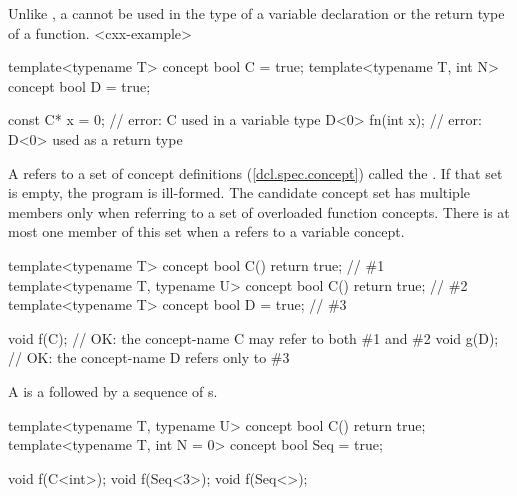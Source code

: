\pnum
\enternote
Unlike , a 
 cannot 
be used in the type of a variable declaration or the return type of
a function.
<cxx-example>
\begin{codeblock}
template<typename T> concept bool C = true;
template<typename T, int N> concept bool D = true;

const C* x = 0;  // error: C used in a variable type
D<0> fn(int x);  // error: D<0> used as a return type
\end{codeblock}
\exitexample
\exitnote

\pnum
A  refers to a
set of concept definitions (\ref{dcl.spec.concept})
called the .
% 
If that set is empty, the program is ill-formed.
% 
\enternote
The candidate concept set has multiple members
only when referring to a set of overloaded function concepts.
There is at most one member of this set when a 
refers to a variable concept.
\exitnote
% 
\enterexample
\begin{codeblock}
template<typename T> concept bool C() { return true; }             // \#1
template<typename T, typename U> concept bool C() { return true; } // \#2
template<typename T> concept bool D = true;                        // \#3

void f(C); // OK: the concept-name C may refer to both \#1 and \#2
void g(D); // OK: the concept-name D refers only to \#3
\end{codeblock}
\exitexample

\pnum
A  is a
 followed by a
sequence of s.
% 
\enterexample
\begin{codeblock}
template<typename T, typename U> concept bool C() { return true; }
template<typename T, int N = 0> concept bool Seq = true;

void f(C<int>);
void f(Seq<3>);
void f(Seq<>);
\end{codeblock}
\exitexample

